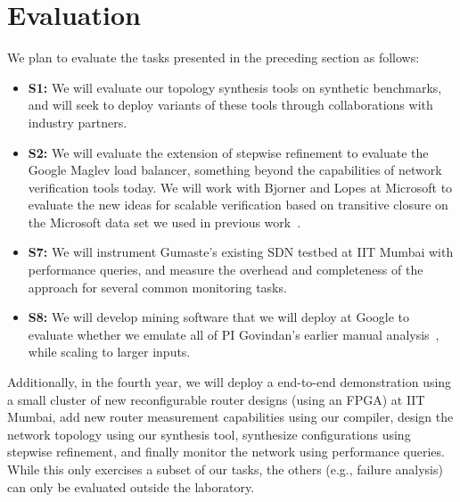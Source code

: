 \section{Evaluation}

We plan to evaluate the tasks presented in the preceding section as follows:
\begin{itemize}
\item {\bf S1:} We will evaluate our topology synthesis tools on synthetic benchmarks, and will seek to deploy variants of these tools through collaborations with industry partners.
\item {\bf S2:}  We will evaluate the extension of stepwise refinement to evaluate the Google Maglev load balancer, something beyond the capabilities of network verification tools today.  We will work with Bjorner and Lopes at Microsoft to evaluate the new ideas for scalable verification based on transitive closure on the Microsoft data set we used in previous work~\cite{surgeries}.
\item {\bf S7:} We will instrument Gumaste's existing SDN testbed at IIT Mumbai with performance queries, and measure the overhead and completeness of the approach for several common monitoring tasks.
\item {\bf S8:} We will develop mining software that we will deploy at Google to evaluate whether we emulate all of PI Govindan's earlier manual analysis~\cite{rameshgoogle}, while scaling to larger inputs.
\end{itemize}
Additionally, in the fourth year, we will deploy a end-to-end demonstration using a small cluster of new reconfigurable router designs (using an FPGA) at IIT Mumbai, add new router measurement capabilities using our compiler, design the network topology using our synthesis tool, synthesize configurations using stepwise refinement, and finally monitor the network using performance queries.  While this only exercises a subset of our tasks, the others (e.g., failure analysis) can only be evaluated outside the laboratory.

